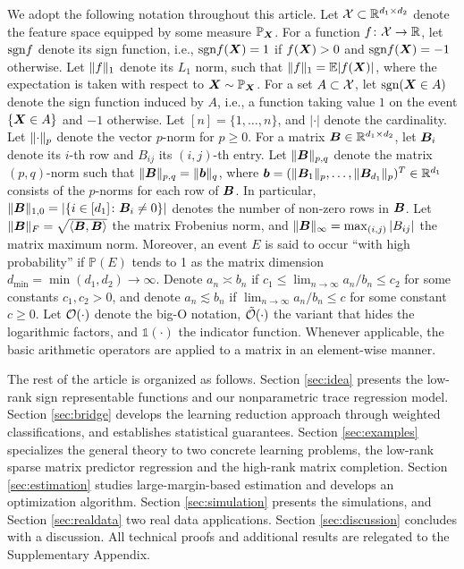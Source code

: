 \documentclass[aos]{imsart}
\theoremstyle{definition}
\def\sign{\textup{sgn}}
\begin{document}
We adopt the following notation throughout this article. Let $\mathcal{X} \subset \mathbb{R}^{d_1\times d_2}$ denote the feature space equipped by some measure $\mathbb{P}_{\bm X}$. For a function $f\colon \mathcal{X} \to \mathbb{R}$, let $\sign f$ denote its sign function, i.e., $\sign f(\mX)=1$ if $f(\bm X)>0$ and $\sign f(\mX)=-1$ otherwise. Let $\lVert f\rVert_1$ denote its $L_1$ norm, such that $\lVert f\rVert_1=\mathbb{E}|f(\bm X)|$, where the expectation is taken with respect to $\bm X \sim \mathbb{P}_{\bm X}$. For a set $A \subset \mathcal{X}$, let $\sign (\mX\in A)$ denote the sign function induced by $A$, i.e., a function taking value $1$ on the event $\{\bm X\in A\}$ and $-1$ otherwise. Let $[n] = \{1,\ldots,n\}$, and $|\cdot|$ denote the cardinality. Let $\lVert\cdot\rVert_p$ denote the vector $p$-norm for $p\geq 0$. For a matrix $\bm B \in \mathbb{R}^{d_1\times d_2}$, let $\bm B_i$ denote its $i$-th row and $B_{ij}$ its $(i,j)$-th entry. Let $\lVert\bm B\rVert_{p,q}$ denote the matrix $(p,q)$-norm such that $\lVert\bm B\rVert_{p,q}=\lVert\bm{b}\rVert_q$, where $\bm{b}=(\lVert\bm B_1\rVert_p,\ldots,\lVert\bm B_{d_1}\rVert_p)^T\in\mathbb{R}^{d_1}$ consists of the $p$-norms for each row of $\bm B$. In particular, $\lVert\bm B\rVert_{1,0}=|\{i\in [d_1]\colon \bm B_i\neq 0\}|$ denotes the number of non-zero rows in $\bm B$. Let $\lVert\bm B\rVert_F=\sqrt{\langle \bm B, \bm B \rangle}$ the matrix Frobenius norm, and $\lVert\bm B\rVert_\infty=\max_{(i,j)}|B_{ij}|$ the matrix maximum norm. Moreover, an event $E$ is said to occur ``with high probability'' if $\mathbb{P}(E)$ tends to 1 as the matrix dimension $d_{\min} = \min(d_1,d_2)\to\infty$. Denote $a_n\asymp b_n$ if $c_1\leq \lim_{n\to \infty} a_n/b_n\leq c_2$ for some constants $c_1,c_2>0$, and denote $a_n\lesssim b_n$ if $\lim_{n\to\infty} a_n/b_n\leq c$ for some constant $c\geq 0$. Let $\mathcal{O}(\cdot)$ denote the big-O notation, $\tilde {\mathcal{O}}(\cdot)$ the variant that hides the logarithmic factors, and $\mathds{1}(\cdot)$ the indicator function. Whenever applicable, the basic arithmetic operators are applied to a matrix in an element-wise manner. 

The rest of the article is organized as follows. Section \ref{sec:idea} presents the low-rank sign representable functions and our nonparametric trace regression model. Section \ref{sec:bridge} develops the learning reduction approach through weighted classifications, and establishes statistical guarantees. Section \ref{sec:examples} specializes the general theory to two concrete learning problems, 
the low-rank sparse matrix predictor regression and the high-rank matrix completion. Section \ref{sec:estimation} studies large-margin-based estimation and develops an optimization algorithm. Section \ref{sec:simulation} presents the simulations, and Section \ref{sec:realdata} two real data applications. Section \ref{sec:discussion} concludes with a discussion. All technical proofs and additional results are relegated to the Supplementary Appendix. 
\end{document}
